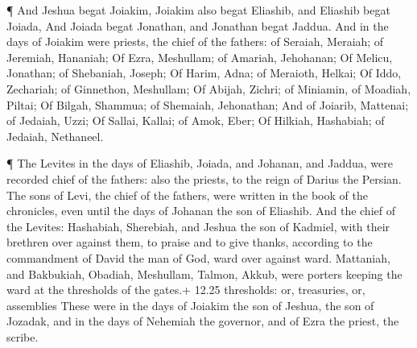  ¶ And Jeshua begat Joiakim, Joiakim also begat Eliashib,
and Eliashib begat Joiada,  And Joiada begat Jonathan, and
Jonathan begat Jaddua.  And in the days of Joiakim were
priests, the chief of the fathers: of Seraiah, Meraiah; of Jeremiah,
Hananiah;  Of Ezra, Meshullam; of Amariah, Jehohanan;
 Of Melicu, Jonathan; of Shebaniah, Joseph; 
Of Harim, Adna; of Meraioth, Helkai;  Of Iddo, Zechariah;
of Ginnethon, Meshullam;  Of Abijah, Zichri; of Miniamin,
of Moadiah, Piltai;  Of Bilgah, Shammua; of Shemaiah,
Jehonathan;  And of Joiarib, Mattenai; of Jedaiah, Uzzi;
 Of Sallai, Kallai; of Amok, Eber;  Of
Hilkiah, Hashabiah; of Jedaiah, Nethaneel.

 ¶ The Levites in the days of Eliashib, Joiada, and
Johanan, and Jaddua, were recorded chief of the fathers: also the
priests, to the reign of Darius the Persian.  The sons of
Levi, the chief of the fathers, were written in the book of the
chronicles, even until the days of Johanan the son of Eliashib.
 And the chief of the Levites: Hashabiah, Sherebiah, and
Jeshua the son of Kadmiel, with their brethren over against them, to
praise and to give thanks, according to the commandment of David the man
of God, ward over against ward.  Mattaniah, and Bakbukiah,
Obadiah, Meshullam, Talmon, Akkub, were porters keeping the ward at the
thresholds of the gates.+ 12.25 thresholds: or, treasuries, or,
assemblies  These were in the days of Joiakim the son of
Jeshua, the son of Jozadak, and in the days of Nehemiah the governor,
and of Ezra the priest, the scribe.

